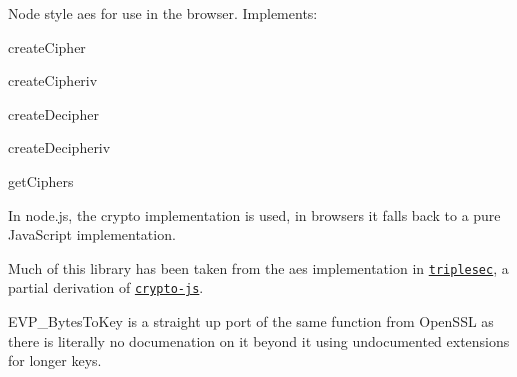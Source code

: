 \href{https://travis-ci.org/crypto-browserify/browserify-aes}{\tt }

Node style aes for use in the browser. Implements\+:


\begin{DoxyItemize}
\item create\+Cipher
\item create\+Cipheriv
\item create\+Decipher
\item create\+Decipheriv
\item get\+Ciphers
\end{DoxyItemize}

In node.\+js, the {\ttfamily crypto} implementation is used, in browsers it falls back to a pure Java\+Script implementation.

Much of this library has been taken from the aes implementation in \href{https://github.com/keybase/triplesec}{\tt triplesec}, a partial derivation of \href{https://code.google.com/p/crypto-js/}{\tt crypto-\/js}.

{\ttfamily E\+V\+P\+\_\+\+Bytes\+To\+Key} is a straight up port of the same function from Open\+S\+SL as there is literally no documenation on it beyond it using \textquotesingle{}undocumented extensions\textquotesingle{} for longer keys. 